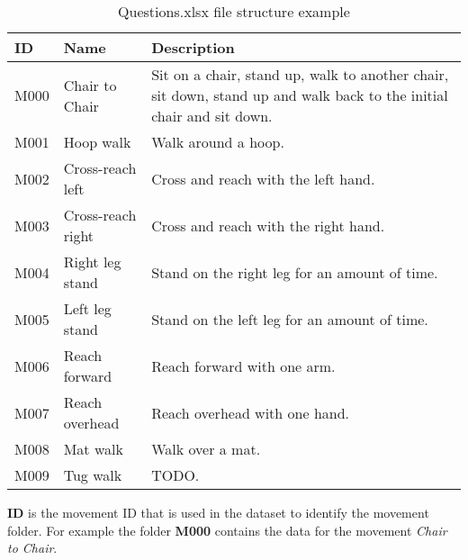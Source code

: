         \begin{table}[htbp]
            \centering
            \begin{tabular}{|p{1cm}|p{3cm}|p{8cm}|}
                \hline
                \textbf{ID} & \textbf{Name} & \textbf{Description} \\
                \hline
                M000 & Chair to Chair & Sit on a chair, stand up, walk to another chair, sit down, stand up and walk back to the initial chair and sit down. \\
                \hline
                M001 & Hoop walk & Walk around a hoop. \\
                \hline
                M002 & Cross-reach left & Cross and reach with the left hand. \\
                \hline
                M003 & Cross-reach right & Cross and reach with the right hand. \\
                \hline
                M004 & Right leg stand & Stand on the right leg for an amount of time. \\
                \hline
                M005 & Left leg stand & Stand on the left leg for an amount of time. \\
                \hline
                M006 & Reach forward & Reach forward with one arm. \\
                \hline
                M007 & Reach overhead & Reach overhead with one hand. \\
                \hline
                M008 & Mat walk & Walk over a mat. \\
               \hline
                M009 & Tug walk & TODO. \\
                \hline
            \end{tabular}

            \caption{Questions.xlsx file structure example}
        \end{table}

        \textbf{ID} is the movement ID that is used in the dataset to identify the movement folder. 
        For example the folder \textbf{M000} contains the data for the movement \textit{Chair to Chair}.

        